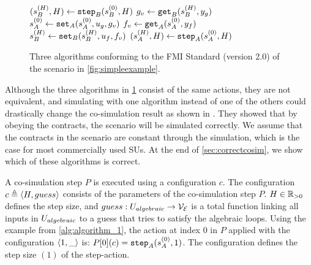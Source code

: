 \begin{figure}[htb]
\begin{minipage}[t]{0.325\textwidth}
\begin{algorithm}[H]
      \begin{algorithmic}[1]
        \scriptsize
        \State $(s_{B}^{(H)},H) \gets \mathtt{step}_{B}(s_{B}^{(0)}, H)$
        \State $g_v \gets \mathtt{get}_{B}(s_{B}^{(H)}, y_{g})$
        \State $s_{A}^{(0)} \gets \mathtt{set}_{A}(s_{A}^{(0)}, u_{g}, g_v)$
        \State $f_v \gets \mathtt{get}_{A}(s_{A}^{(0)}, y_{f})$
        \State $s_{B}^{(H)} \gets \mathtt{set}_{B}(s_{B}^{(H)}, u_{f}, f_v)$
        \State $(s_{A}^{(H)},H) \gets \mathtt{step}_{A}(s_{A}^{(0)}, H)$
      \end{algorithmic}
    \end{algorithm}
    \vspace{4pt}
  \end{minipage}
  \vspace{-2em}
  \caption{Three algorithms conforming to the FMI Standard (version 2.0) of the scenario in \cref{fig:simpleexample}.}
  \label{fig:algorithms}
\end{figure}

Although the three algorithms in \cref{fig:algorithms} consist of the same actions, they are not equivalent, and simulating with one algorithm instead of one of the others could drastically change the co-simulation result as shown in \cite{Gomes2019c}. 
They showed that by obeying the contracts, the scenario will be simulated correctly. We assume that the contracts in the scenario are constant through the simulation, which is the case for most commercially used SUs.
At the end of \cref{sec:correctcosim}, we show which of these algorithms is correct.

A co-simulation step $P$ is executed using a configuration $c$. The configuration $c \triangleq  \left\langle H, guess \right\rangle $ consists of the parameters of the co-simulation step $P$.  $H \in \mathbb{R}_{> 0}$ defines the step size, and $guess : U_{algebraic} \to \mathcal{V_{E}}$ is a total function linking all inputs in $U_{algebraic}$ to a guess that tries to satisfy the algebraic loops. Using the example from \cref{alg:algorithm_1}, the action at index 0 in $P$ applied with the configuration $ \left\langle 1,\_ \right\rangle $ is: $P[0](c) = \mathtt{step}_{A}(s_{A}^{(0)}, 1)$. The configuration defines the step size $(1)$ of the step-action. 

